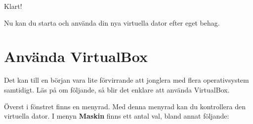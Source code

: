 \documentclass[a4paper,final]{memoir} %
\begin{document}
Klart!

Nu kan du starta och använda din nya virtuella dator efter eget behag.


\section{Använda VirtualBox}\label{sec:virtualbox-anvanda}

Det kan till en början vara lite förvirrande att jonglera med flera operativsystem samtidigt. Läs på om följande, så blir det enklare att använda VirtualBox.

Överst i fönstret finns en menyrad. Med denna menyrad kan du kontrollera den virtuella dator. I menyn \textbf{Maskin} finns ett antal val, bland annat följande:
\end{document}
